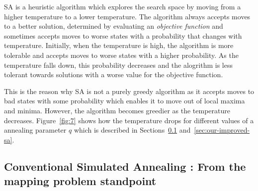 SA is a heuristic algorithm which explores the search
space by moving from a higher temperature to a lower temperature. The algorithm
always accepts moves to a better solution, determined by evaluating an
\textit{objective function} and sometimes accepts moves to worse states with a
probability that changes with temperature. Initially, when the temperature is
high, the algorithm is more tolerable and accepts moves to worse states with a
higher probability. As the temperature falls down, this probability decreases
and the alogrithm is less tolerant towards solutions with a worse value for the
objective function.

This is the reason why SA is not a purely greedy algorithm as it accepts
moves to bad states with some probability which enables it to move out
of local maxima and minima. However, the algorithm becomes greedier as
the temperature decreases. Figure~\ref{fig:7} shows how the temperature
drops for different values of a annealing parameter $q$ which is
described in Sections~\ref{sec:conventional-SA}
and~\ref{sec:our-improved-sa}.

\subsection{Conventional Simulated Annealing : From the mapping problem
  standpoint}
\label{sec:conventional-SA}

